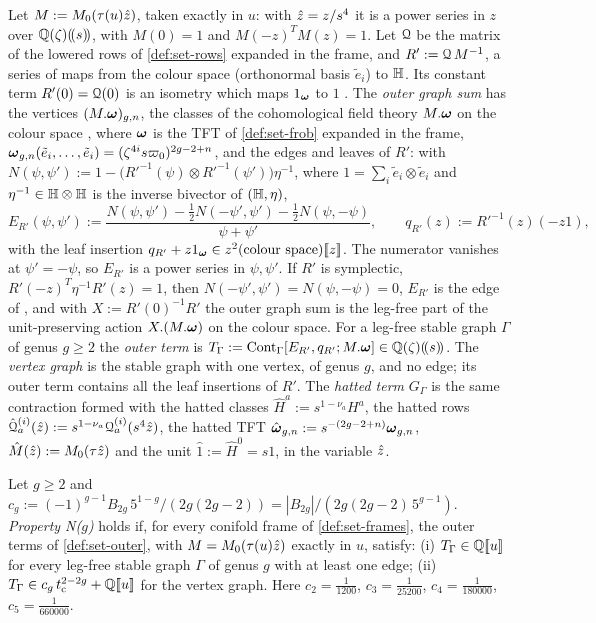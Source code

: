 \begin{defn}
\label{def:set-outer}
Let $M:=M_{0}(\tau(u)\hat{z})$, taken exactly in $u$: with $\hat{z}=z/s^4$ it is a power series in $z$ over $\mathbb{Q}(\zeta)(\!(s)\!)$, with $M(0)=1$ and $M(-z)^TM(z)=1$. Let $\mathcal{Q}$ be the matrix of the lowered rows of \cref{def:set-rows} expanded in the frame, and $R':=\mathcal{Q}\,M^{-1}$, a series of maps from the colour space (orthonormal basis $\tilde e_i$) to $\mathbb{H}$. Its constant term $R'(0)=\mathcal{Q}(0)$ is an isometry which maps $1_{\boldsymbol{\omega}}$ to $1$ . The \emph{outer graph sum} has the vertices $(M.\boldsymbol{\omega})_{g,n}$, the classes of the cohomological field theory $M.\boldsymbol{\omega}$ on the colour space \cite[Def.~2.13]{PPZ15}, where $\boldsymbol{\omega}$ is the TFT of \cref{def:set-frob} expanded in the frame, $\boldsymbol{\omega}_{g,n}(\tilde e_i,\dots,\tilde e_i)=(\zeta^{4i}s\varpi_0)^{2g-2+n}$, and the edges and leaves of $R'$: with $N(\psi,\psi'):=1-\bigl(R'^{-1}(\psi)\otimes R'^{-1}(\psi')\bigr)\eta^{-1}$, where $1=\sum_i\tilde e_i\otimes\tilde e_i$ and $\eta^{-1}\in\mathbb{H}\otimes\mathbb{H}$ is the inverse bivector of $(\mathbb{H},\eta)$,
\[
E_{R'}(\psi,\psi'):=\frac{N(\psi,\psi')-\frac12N(-\psi',\psi')-\frac12N(\psi,-\psi)}{\psi+\psi'},\qquad q_{R'}(z):=R'^{-1}(z)(-z1),
\]
with the leaf insertion $q_{R'}+z1_{\boldsymbol{\omega}}\in z^2(\text{colour space})[\![ z ]\!]$. The numerator vanishes at $\psi'=-\psi$, so $E_{R'}$ is a power series in $\psi,\psi'$. If $R'$ is symplectic, $R'(-z)^T\eta^{-1}R'(z)=1$, then $N(-\psi',\psi')=N(\psi,-\psi)=0$, $E_{R'}$ is the edge of \cite[Def.~2.2]{PPZ15}, and with $X:=R'(0)^{-1}R'$ the outer graph sum is the leg-free part of the unit-preserving action $X.(M.\boldsymbol{\omega})$ on the colour space. For a leg-free stable graph $\Gamma$ of genus $g\geq2$ the \emph{outer term} is $T_\Gamma:=\mathrm{Cont}_\Gamma[E_{R'},q_{R'};M.\boldsymbol{\omega}]\in\mathbb{Q}(\zeta)(\!(s)\!)$. The \emph{vertex graph} is the stable graph with one vertex, of genus $g$, and no edge; its outer term contains all the leaf insertions of $R'$. The \emph{hatted term} $G_\Gamma$ is the same contraction formed with the hatted classes $\hat H^a:=s^{1-\nu_a}H^a$, the hatted rows $\hat{\mathcal{Q}}^{(i)}_a(\hat{z}):=s^{1-\nu_a}\mathcal{Q}^{(i)}_a(s^4\hat{z})$, the hatted TFT $\hat{\boldsymbol{\omega}}_{g,n}:=s^{-(2g-2+n)}\boldsymbol{\omega}_{g,n}$, $\hat M(\hat{z}):=M_{0}(\tau\hat{z})$ and the unit $\hat1:=\hat H^0=s1$, in the variable $\hat{z}$.
\end{defn}

\begin{defn}
\label{def:set-N}
Let $g\geq2$ and $c_g:=(-1)^{g-1}B_{2g}\,5^{1-g}/(2g(2g-2))=|B_{2g}|/(2g(2g-2)\,5^{g-1})$. \emph{Property N($g$)} holds if, for every conifold frame of \cref{def:set-frames}, the outer terms of \cref{def:set-outer}, with $M=M_{0}(\tau(u)\hat{z})$ exactly in $u$, satisfy: (i) $T_\Gamma\in\mathbb{Q}[\![ u ]\!]$ for every leg-free stable graph $\Gamma$ of genus $g$ with at least one edge; (ii) $T_\Gamma\in c_g\,t_{\mathrm{c}}^{2-2g}+\mathbb{Q}[\![ u ]\!]$ for the vertex graph. Here $c_2=\frac1{1200}$, $c_3=\frac1{25200}$, $c_4=\frac1{180000}$, $c_5=\frac1{660000}$.
\end{defn}
